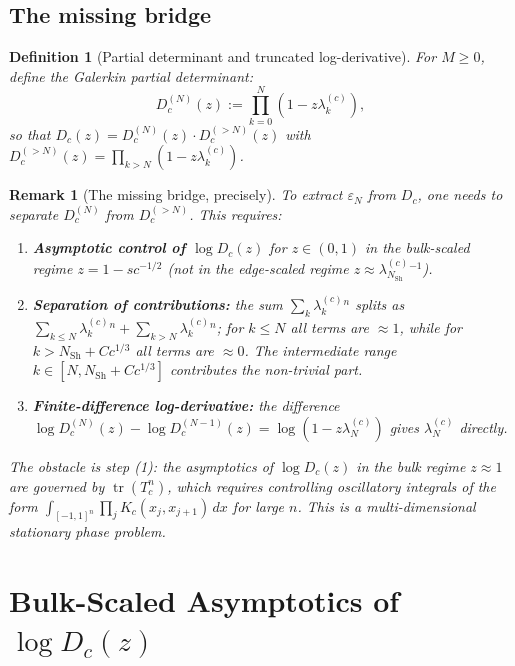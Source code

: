 \documentclass[12pt,a4paper]{article}
\newtheorem{definition}[theorem]{Definition}
\newtheorem{remark}[theorem]{Remark}
\newcommand{\lam}[1]{\lambda_{#1}^{(c)}}
\newcommand{\Tc}{T_c}
\newcommand{\Dc}{D_c}
\begin{document}
\subsection{The missing bridge}

\begin{definition}[Partial determinant and truncated log-derivative]
For $M \geq 0$, define the \emph{Galerkin partial determinant}:
\[
  \Dc^{(N)}(z) := \prod_{k=0}^{N} (1 - z\lam{k}),
\]
so that $\Dc(z) = \Dc^{(N)}(z) \cdot \Dc^{(>N)}(z)$
with $\Dc^{(>N)}(z) = \prod_{k > N}(1 - z\lam{k})$.
\end{definition}

\begin{remark}[The missing bridge, precisely]
\label{rem:bridge}
To extract $\varepsilon_N$ from $\Dc$, one needs
to separate $\Dc^{(N)}$ from $\Dc^{(>N)}$.
This requires:
\begin{enumerate}[nosep]
  \item \textbf{Asymptotic control of $\log \Dc(z)$}
        for $z \in (0, 1)$ in the
        \emph{bulk-scaled regime} $z = 1 - sc^{-1/2}$
        (not in the edge-scaled regime $z \approx \lam{N_{\mathrm{Sh}}}^{-1}$).
  \item \textbf{Separation of contributions:}
        the sum $\sum_k \lam{k}^n$ splits as
        $\sum_{k \leq N} \lam{k}^n + \sum_{k > N}\lam{k}^n$;
        for $k \leq N$ all terms are $\approx 1$,
        while for $k > N_{\mathrm{Sh}} + C c^{1/3}$
        all terms are $\approx 0$.
        The intermediate range
        $k \in [N, N_{\mathrm{Sh}} + Cc^{1/3}]$
        contributes the non-trivial part.
  \item \textbf{Finite-difference log-derivative:}
        the difference
        $\log\Dc^{(N)}(z) - \log\Dc^{(N-1)}(z)
        = \log(1 - z\lam{N})$
        gives $\lam{N}$ directly.
\end{enumerate}
The obstacle is step (1): the asymptotics of
$\log \Dc(z)$ in the bulk regime $z \approx 1$
are governed by $\operatorname{tr}(\Tc^n)$,
which requires controlling oscillatory integrals
of the form
$\int_{[-1,1]^n} \prod_j K_c(x_j, x_{j+1})\,dx$
for large $n$.
This is a \emph{multi-dimensional stationary phase problem}.
\end{remark}

\section{Bulk-Scaled Asymptotics of $\log D_c(z)$}
\label{sec:bulk}
\end{document}
